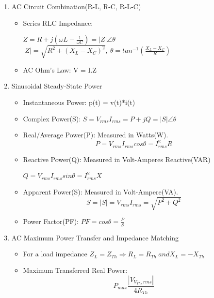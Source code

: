 \documentclass{article}
\begin{document}
\begin{enumerate}
\begin{itemize}
        \end{itemize}
    \item AC Circuit Combination(R-L, R-C, R-L-C)
        \begin{itemize}
            \item Series RLC Impedance:
            \begin{center}
                $ Z = R + j(\omega L- \frac{1}{\omega C}) = |Z|\angle \theta $ 
                $|Z|=\sqrt{R^2 +(X_L - X_C)^2}, \ \theta = tan^{-1}(\frac{X_L - X_C}{R}) $
            \end{center}
            \item AC Ohm's Law: V = I.Z
        \end{itemize}
    \item Sinusoidal Steady-State Power
    \begin{itemize}
        \item Instantaneous Power: p(t) = v(t)*i(t)
        \item Complex Power(S): $ S = V_{rms}I_{rms} = P + jQ = |S|\angle \theta $
        \item Real/Average Power(P): Measured in Watts(W). $$P = V_{rms}I_{rms}cos\theta = I_{rms}^2R $$
        \item Reactive Power(Q): Measured in Volt-Amperes Reactive(VAR)
        \begin{center}
            $Q = V_{rms}I_{rms}sin\theta = I_{rms}^2X $
        \end{center} 
        \item Apparent Power(S): Measured in Volt-Ampere(VA). $$ S = |S| = V_{rms}I_{rms} = \sqrt{P^2 + Q^2}$$
        \item Power Factor(PF): $ PF = cos\theta = \frac{P}{S}$
    \end{itemize}
    \item AC Maximum Power Transfer and Impedance Matching
    \begin{itemize}
        \item For a load impedance $ Z_L = Z_{Th} \Rightarrow R_L = R_{Th} \ and X_L = -X_{Th} $
        \item Maximum Transferred Real Power: $$ P_{max} \frac{|V_{V_{Th},rms}|}{4R_{Th}} $$
        
    \end{itemize}

\end{enumerate}
\end{document}
